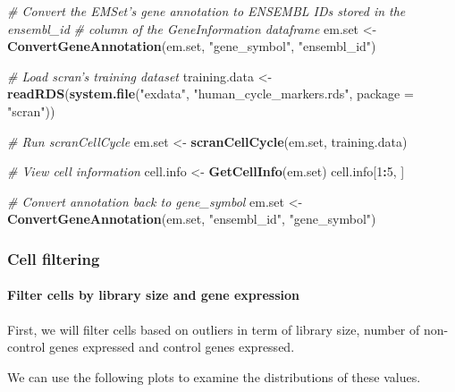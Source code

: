 \documentclass[]{article}
\newenvironment{Shaded}{\begin{snugshade}}{\end{snugshade}}
\newcommand{\CommentTok}[1]{\textcolor[rgb]{0.56,0.35,0.01}{\textit{#1}}}
\newcommand{\DataTypeTok}[1]{\textcolor[rgb]{0.13,0.29,0.53}{#1}}
\newcommand{\DecValTok}[1]{\textcolor[rgb]{0.00,0.00,0.81}{#1}}
\newcommand{\KeywordTok}[1]{\textcolor[rgb]{0.13,0.29,0.53}{\textbf{#1}}}
\newcommand{\NormalTok}[1]{#1}
\newcommand{\OperatorTok}[1]{\textcolor[rgb]{0.81,0.36,0.00}{\textbf{#1}}}
\newcommand{\StringTok}[1]{\textcolor[rgb]{0.31,0.60,0.02}{#1}}
\let\oldparagraph\paragraph
\renewcommand{\paragraph}[1]{\oldparagraph{#1}\mbox{}}
\begin{document}
\begin{Shaded}
\begin{Highlighting}[]
\CommentTok{# Convert the EMSet's gene annotation to ENSEMBL IDs stored in the ensembl_id }
\CommentTok{# column of the GeneInformation dataframe}
\NormalTok{em.set <-}\StringTok{ }\KeywordTok{ConvertGeneAnnotation}\NormalTok{(em.set, }\StringTok{"gene_symbol"}\NormalTok{, }\StringTok{"ensembl_id"}\NormalTok{)}

\CommentTok{# Load scran's training dataset}
\NormalTok{training.data <-}\StringTok{ }\KeywordTok{readRDS}\NormalTok{(}\KeywordTok{system.file}\NormalTok{(}\StringTok{"exdata"}\NormalTok{, }\StringTok{"human_cycle_markers.rds"}\NormalTok{, }
                                     \DataTypeTok{package =} \StringTok{"scran"}\NormalTok{))}

\CommentTok{# Run scranCellCycle}
\NormalTok{em.set <-}\StringTok{ }\KeywordTok{scranCellCycle}\NormalTok{(em.set, training.data)}

\CommentTok{# View cell information}
\NormalTok{cell.info <-}\StringTok{ }\KeywordTok{GetCellInfo}\NormalTok{(em.set)}
\NormalTok{cell.info[}\DecValTok{1}\OperatorTok{:}\DecValTok{5}\NormalTok{, ]}

\CommentTok{# Convert annotation back to gene_symbol}
\NormalTok{em.set <-}\StringTok{ }\KeywordTok{ConvertGeneAnnotation}\NormalTok{(em.set, }\StringTok{"ensembl_id"}\NormalTok{, }\StringTok{"gene_symbol"}\NormalTok{)}
\end{Highlighting}
\end{Shaded}

\hypertarget{cell-filtering}{%
\subsubsection{Cell filtering}\label{cell-filtering}}

\hypertarget{filter-cells-by-library-size-and-gene-expression}{%
\paragraph{Filter cells by library size and gene
expression}\label{filter-cells-by-library-size-and-gene-expression}}

First, we will filter cells based on outliers in term of library size,
number of non-control genes expressed and control genes expressed.

We can use the following plots to examine the distributions of these
values.
\end{document}
